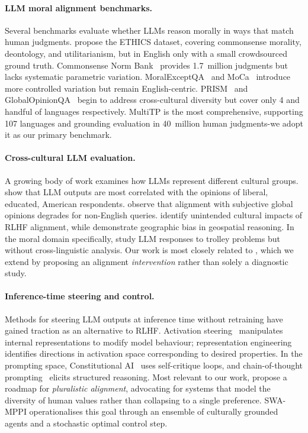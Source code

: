 \documentclass{article}
\begin{document}
\paragraph{LLM moral alignment benchmarks.}
Several benchmarks evaluate whether LLMs reason morally in ways that match human
judgments. \citet{hendrycks2021aligning} propose the ETHICS dataset, covering
commonsense morality, deontology, and utilitarianism, but in English only with
a small crowdsourced ground truth. Commonsense Norm Bank~\citep{commonsense2021}
provides 1.7~million judgments but lacks systematic parametric variation.
MoralExceptQA~\citep{jin2022exceptions} and MoCa~\citep{nie2023moca} introduce
more controlled variation but remain English-centric. PRISM~\citep{kirk2024prism}
and GlobalOpinionQA~\citep{durmus2023global} begin to address cross-cultural
diversity but cover only 4 and handful of languages respectively. MultiTP
\citep{jin2025multitp} is the most comprehensive, supporting 107 languages and
grounding evaluation in 40~million human judgments-we adopt it as our primary
benchmark.

\paragraph{Cross-cultural LLM evaluation.}
A growing body of work examines how LLMs represent different cultural groups.
\citet{santurkar2023opinions} show that LLM outputs are most correlated with the
opinions of liberal, educated, American respondents. \citet{durmus2023global}
observe that alignment with subjective global opinions degrades for non-English
queries. \citet{ryan2024unintended} identify unintended cultural impacts of
RLHF alignment, while \citet{manvi2024geographic} demonstrate geographic bias in
geospatial reasoning. In the moral domain specifically, \citet{takemoto2024moral}
study LLM responses to trolley problems but without cross-linguistic analysis.
Our work is most closely related to \citet{jin2025multitp}, which we extend by
proposing an alignment \emph{intervention} rather than solely a diagnostic study.

\paragraph{Inference-time steering and control.}
Methods for steering LLM outputs at inference time without retraining have gained
traction as an alternative to RLHF. Activation steering~\citep{arditi2025refusal}
manipulates internal representations to modify model behaviour; representation
engineering~\citep{zou2023representation} identifies directions in activation space
corresponding to desired properties. In the prompting space, Constitutional
AI~\citep{bai2022constitutional} uses self-critique loops, and chain-of-thought
prompting~\citep{wei2022chain} elicits structured reasoning. Most relevant to our
work, \citet{sorensen2024roadmap} propose a roadmap for \emph{pluralistic
alignment}, advocating for systems that model the diversity of human values rather
than collapsing to a single preference. SWA-MPPI operationalises this goal through
an ensemble of culturally grounded agents and a stochastic optimal control step.
\end{document}
